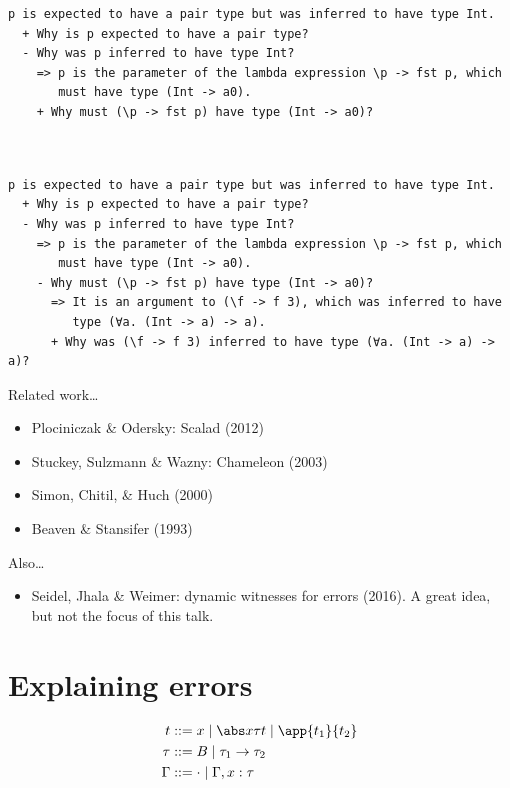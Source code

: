 \documentclass[xcolor=svgnames,12pt,aspectratio=169]{beamer}
\newenvironment{xframe}[1][]
  {\begin{frame}[fragile,environment=xframe,#1]}
  {\end{frame}}
\begin{document}
\begin{xframe}{}
  \small
\begin{verbatim}
p is expected to have a pair type but was inferred to have type Int.
  + Why is p expected to have a pair type?
  - Why was p inferred to have type Int?
    => p is the parameter of the lambda expression \p -> fst p, which
       must have type (Int -> a0).
    + Why must (\p -> fst p) have type (Int -> a0)?



\end{verbatim}
\end{xframe}

\begin{xframe}{}
  \small
\begin{verbatim}
p is expected to have a pair type but was inferred to have type Int.
  + Why is p expected to have a pair type?
  - Why was p inferred to have type Int?
    => p is the parameter of the lambda expression \p -> fst p, which
       must have type (Int -> a0).
    - Why must (\p -> fst p) have type (Int -> a0)?
      => It is an argument to (\f -> f 3), which was inferred to have
         type (∀a. (Int -> a) -> a).
      + Why was (\f -> f 3) inferred to have type (∀a. (Int -> a) -> a)?
\end{verbatim}
\end{xframe}

\begin{xframe}{Related work\dots}
  \begin{itemize}
  \item Plociniczak \& Odersky: Scalad (2012)
  \item Stuckey, Sulzmann \& Wazny: Chameleon (2003)
  \item Simon, Chitil, \& Huch (2000)
  \item Beaven \& Stansifer (1993)
  \end{itemize}

  Also\dots
  \begin{itemize}
  \item Seidel, Jhala \& Weimer: dynamic witnesses for errors
    (2016). A great idea, but not the focus of this talk.
  \end{itemize}
\end{xframe}
\section{Explaining errors}

\begin{xframe}{}
\begin{align*}
  t &::= x \mid \abs x \tau t \mid \app{t_1}{t_2} \\
  \tau &::= B \mid \tau_1 \to \tau_2 \\
  \Gamma &::= \cdot \mid \Gamma,x:\tau
\end{align*}
\end{xframe}
\end{document}

